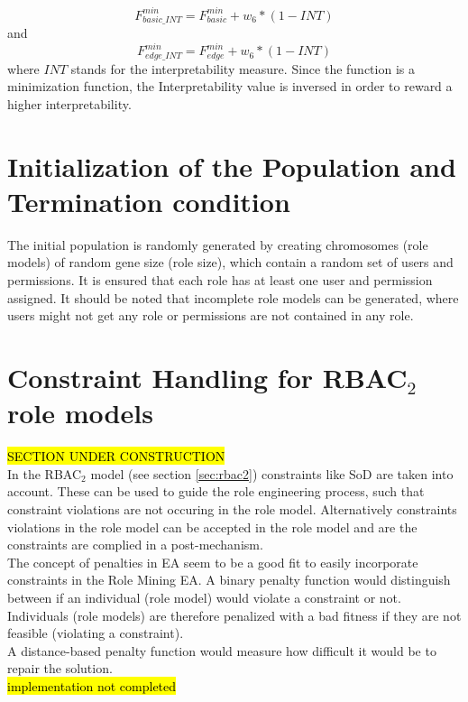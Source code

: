 \begin{itemize}
            \begin{equation}\label{eq:FBasicMin_INT}
                F_{basic\_INT}^{min} = F_{basic}^{min} + w_6 * (1-INT)
            \end{equation}
            and
            \begin{equation}\label{eq:FEdgeMin_INT}
                F_{edge\_INT}^{min} = F_{edge}^{min} + w_6 * (1-INT)
            \end{equation}
            where $INT$ stands for the interpretability measure. Since the function is a minimization function, the Interpretability value is inversed in order to reward a higher interpretability.
        \end{itemize}
    
    \section{Initialization of the Population and Termination condition}
    The initial population is randomly generated by creating chromosomes (role models) of random gene size (role size), which contain a random set of users and permissions. It is ensured that each role has at least one user and permission assigned. It should be noted that incomplete role models can be generated, where users might not get any role or permissions are not contained in any role.
    
    \section{Constraint Handling for RBAC$_2$ role models}
    \hl{SECTION UNDER CONSTRUCTION}\\
    In the RBAC$_2$ model (see section \ref{sec:rbac2}) constraints like SoD are taken into account. These can be used to guide the role engineering process, such that constraint violations are not occuring in the role model. Alternatively constraints violations in the role model can be accepted in the role model and are the constraints are complied in a post-mechanism.\\
    The concept of penalties in EA seem to be a good fit to easily incorporate constraints in the Role Mining EA. A binary penalty function would distinguish between if an individual (role model) would violate a constraint or not. Individuals (role models) are therefore penalized with a bad fitness if they are not feasible (violating a constraint).\\
    A distance-based penalty function would measure how difficult it would be to repair the solution.\\
    \hl{implementation not completed}
    
